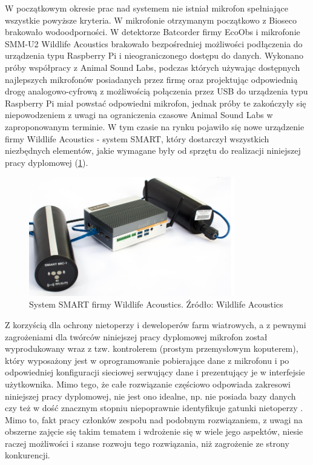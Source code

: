 \documentclass{sprz}
\begin{document}
W początkowym okresie prac nad systemem nie istniał mikrofon spełniające wszystkie powyższe kryteria. W mikrofonie otrzymanym początkowo z Bioseco brakowało wodoodporności. W detektorze Batcorder firmy EcoObs i mikrofonie SMM-U2 Wildlife Acoustics brakowało bezpośredniej możliwości podłączenia do urządzenia typu Raspberry Pi i nieograniczonego dostępu do danych. Wykonano próby współpracy z Animal Sound Labs, podczas których używając dostępnych najlepszych mikrofonów posiadanych przez firmę oraz projektując odpowiednią drogę analogowo-cyfrową z możliwością połączenia przez USB do urządzenia typu Raspberry Pi miał powstać odpowiedni mikrofon, jednak próby te zakończyły się niepowodzeniem z uwagi na ograniczenia czasowe Animal Sound Labs w zaproponowanym terminie. W tym czasie na rynku pojawiło się nowe urządzenie firmy Wildlife Acoustics - system SMART, który dostarczył wszystkich niezbędnych elementów, jakie wymagane były od sprzętu do realizacji niniejszej pracy dyplomowej (\ref{img:smart}). 

\begin{figure}[h]
  \centering
  \includegraphics[width=0.8\textwidth]{sprz/smart.png}
  \caption{System SMART firmy Wildlife Acoustics. Źródło: Wildlife Acoustics}
  \label{img:smart}
\end{figure} 

Z korzyścią dla ochrony nietoperzy i deweloperów farm wiatrowych, a z pewnymi zagrożeniami dla twórców niniejszej pracy dyplomowej mikrofon został wyprodukowany wraz z tzw. kontrolerem (prostym przemysłowym koputerem), który wyposażony jest w oprogramowanie pobierające dane z mikrofonu i po odpowiedniej konfiguracji sieciowej serwujący dane i prezentujący je w interfejsie użytkownika. Mimo tego, że całe rozwiązanie częściowo odpowiada zakresowi niniejszej pracy dyplomowej, nie jest ono idealne, np. nie posiada bazy danych czy też w dość znacznym stopniu niepoprawnie identyfikuje gatunki nietoperzy \cite{kaleidoscope-bias}. Mimo to, fakt pracy członków zespołu nad podobnym rozwiązaniem, z uwagi na obszerne zajęcie się takim tematem i wdrożenie się w wiele jego aspektów, niesie raczej możliwości i szanse rozwoju tego rozwiązania, niż zagrożenie ze strony konkurencji.
\end{document}
